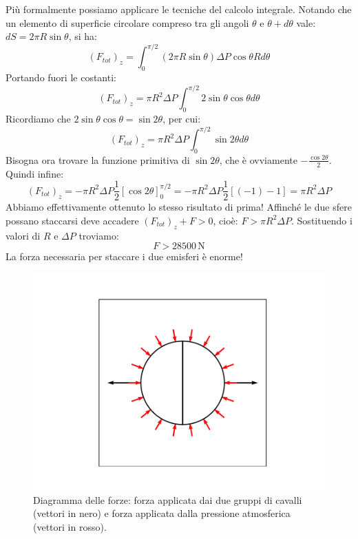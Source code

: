 \documentclass[12pt,a4paper]{book}
\begin{document}
Più formalmente possiamo applicare le tecniche del calcolo integrale. Notando che un elemento di superficie circolare compreso tra gli angoli $\theta$ e $\theta + d\theta$ vale: $dS=2\pi R \sin\theta$, si ha:
\begin{equation*}
(F_{tot})_z= \int_0^{\pi/2}(2\pi R \sin\theta) \Delta P \cos \theta R d\theta 
\end{equation*}
Portando fuori le costanti: 
\begin{equation*}
(F_{tot})_z= \pi R^2  \Delta P \int_0^{\pi/2} 2 \sin\theta \cos \theta  d\theta 
\end{equation*}
Ricordiamo che $2\sin\theta \cos \theta= \sin 2\theta$, per cui:
\begin{equation*}
(F_{tot})_z= \pi R^2  \Delta P \int_0^{\pi/2}  \sin 2\theta  d\theta 
\end{equation*}
Bisogna ora trovare la funzione primitiva di $\sin 2\theta$, che è ovviamente $-\frac{\cos 2\theta}{2}$. Quindi infine:
\begin{equation*}
(F_{tot})_z= - \pi R^2  \Delta P \frac{1}{2} [\cos 2\theta]_0^{\pi/2}  =
 - \pi R^2  \Delta P \frac{1}{2}  [(-1)-1]= \pi R^2  \Delta P 
\end{equation*}
Abbiamo effettivamente ottenuto lo stesso risultato di prima!
Affinché le due sfere possano staccarsi deve accadere $(F_{tot})_z+F>0$, cioè: $F>\pi R^2  \Delta P$. Sostituendo i valori di $R$ e $\Delta P$ troviamo:
\begin{equation*}
F>28500 \,\text{N}
\end{equation*}
La forza necessaria per staccare i due emisferi è enorme! \\

 \begin{figure}[!ht]
 \centering
\includegraphics[scale=0.55]{magde2.pdf}
\caption{Diagramma delle forze: forza applicata dai due gruppi di cavalli (vettori in nero) e forza applicata dalla pressione atmosferica (vettori in rosso). \label{fig:magde2} }
\end{figure}
\end{document}
